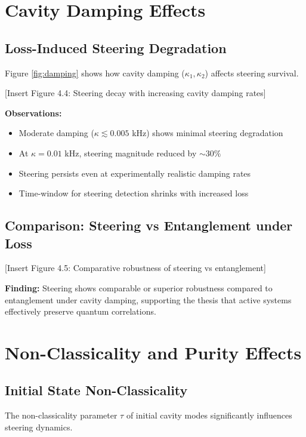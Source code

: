 \section{Cavity Damping Effects}

\subsection{Loss-Induced Steering Degradation}

Figure \ref{fig:damping} shows how cavity damping ($\kappa_1, \kappa_2$) affects steering survival.

[Insert Figure 4.4: Steering decay with increasing cavity damping rates]

\textbf{Observations:}
\begin{itemize}
	\item Moderate damping ($\kappa \lesssim 0.005$ kHz) shows minimal steering degradation
	\item At $\kappa = 0.01$ kHz, steering magnitude reduced by $\sim 30\%$
	\item Steering persists even at experimentally realistic damping rates
	\item Time-window for steering detection shrinks with increased loss
\end{itemize}

\subsection{Comparison: Steering vs Entanglement under Loss}

[Insert Figure 4.5: Comparative robustness of steering vs entanglement]

\textbf{Finding:} Steering shows comparable or superior robustness compared to entanglement under cavity damping, supporting the thesis that active systems effectively preserve quantum correlations.

\section{Non-Classicality and Purity Effects}

\subsection{Initial State Non-Classicality}

The non-classicality parameter $\tau$ of initial cavity modes significantly influences steering dynamics.

